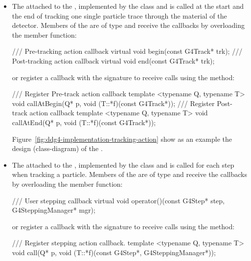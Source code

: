 \documentclass[10pt,a4paper]{article}
\begin{document}
\begin{itemize}
\item The  attached to the , 
    implemented by the   class 
    and is called at the start and the end of tracking one single particle 
    trace through the material of the detector.
    Members of the  are of type
     and receive the callbacks by overloading the member function:
\begin{unnumberedcode}
/// Pre-tracking action callback
virtual void begin(const G4Track* trk);
/// Post-tracking action callback
virtual void end(const G4Track* trk);
\end{unnumberedcode}
    or register a callback with the signature {}
    to receive calls using the method:
\begin{unnumberedcode}
/// Register Pre-track action callback
template <typename Q, typename T> void callAtBegin(Q* p, void (T::*f)(const G4Track*));
/// Register Post-track action callback
template <typename Q, typename T> void callAtEnd(Q* p, void (T::*f)(const G4Track*));
\end{unnumberedcode}
Figure~\ref{fig:ddg4-implementation-tracking-action} show as an example 
the design (class-diagram) of the .


\item The  attached to the , implemented 
    by the   class and is called for each
    step when tracking a particle.
    Members of the  are of type
     and receive the callbacks by overloading the member function:
\begin{unnumberedcode}
/// User stepping callback
virtual void operator()(const G4Step* step, G4SteppingManager* mgr);
\end{unnumberedcode}
    or register a callback with the signature {}
    to receive calls using the method:
\begin{unnumberedcode}
/// Register stepping action callback.
template <typename Q, typename T> void call(Q* p, void (T::*f)(const G4Step*, 
                                                               G4SteppingManager*));
\end{unnumberedcode}



\end{itemize}
\end{document}
